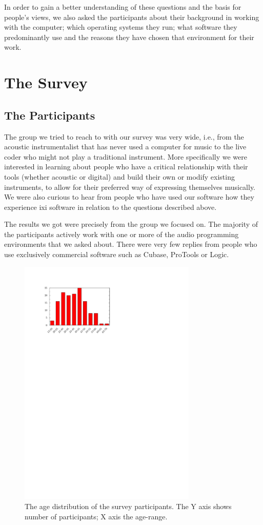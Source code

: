 In order to gain a better understanding of these questions and the basis for
people's views, we also asked the participants about their background in working
with the computer; which operating systems they run; what software they
predominantly use and the reasons they have chosen that environment for their
work.

\section{The Survey}

\subsection{The Participants}
The group we tried to reach to with our survey was very wide, i.e., from the
acoustic instrumentalist that has never used a computer for music to the live
coder who might not play a traditional instrument. More specifically we were
interested in learning about people who have a critical relationship with their
tools (whether acoustic or digital) and build their own or modify existing
instruments, to allow for their preferred way of expressing themselves musically.
We were also curious to hear from people who have used our software how they
experience ixi software in relation to the questions described above.

The results we got were precisely from the group we focused on. The majority of
the participants actively work with one or more of the audio programming
environments that we asked about. There were very few replies from people who use
exclusively commercial software such as Cubase, ProTools or Logic.

\begin{figure}[t]
\centering
\includegraphics[width=240pt]{img-1-eps-converted-to.pdf}
\caption{The age distribution of the survey participants. The Y axis
shows number of participants; X axis the age-range.}
\label{Magnusson:fig:1} 
\end{figure}

